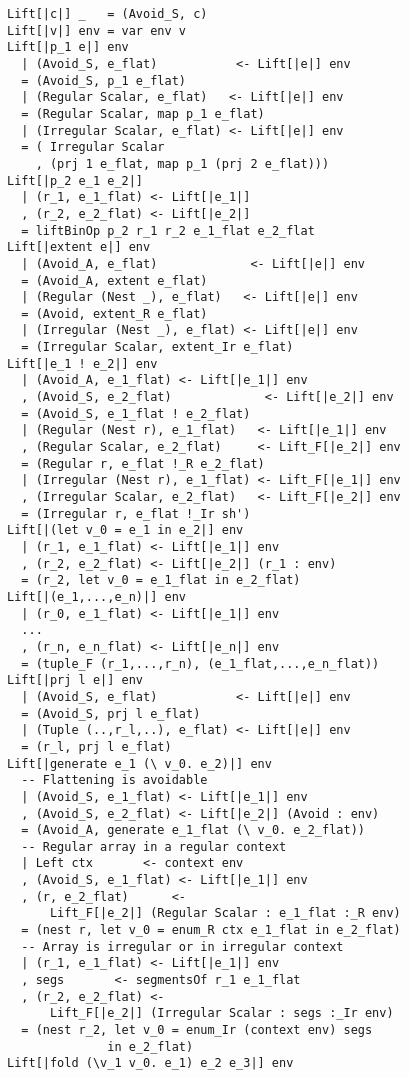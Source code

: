\begin{figure}
\begin{lstlisting}[multicols=2,style=ndp]
Lift[|c|] _   = (Avoid_S, c)
Lift[|v|] env = var env v
Lift[|p_1 e|] env
  | (Avoid_S, e_flat)           <- Lift[|e|] env
  = (Avoid_S, p_1 e_flat)
  | (Regular Scalar, e_flat)   <- Lift[|e|] env
  = (Regular Scalar, map p_1 e_flat)
  | (Irregular Scalar, e_flat) <- Lift[|e|] env
  = ( Irregular Scalar
    , (prj 1 e_flat, map p_1 (prj 2 e_flat)))
Lift[|p_2 e_1 e_2|]
  | (r_1, e_1_flat) <- Lift[|e_1|]
  , (r_2, e_2_flat) <- Lift[|e_2|]
  = liftBinOp p_2 r_1 r_2 e_1_flat e_2_flat
Lift[|extent e|] env
  | (Avoid_A, e_flat)             <- Lift[|e|] env
  = (Avoid_A, extent e_flat)
  | (Regular (Nest _), e_flat)   <- Lift[|e|] env
  = (Avoid, extent_R e_flat)
  | (Irregular (Nest _), e_flat) <- Lift[|e|] env
  = (Irregular Scalar, extent_Ir e_flat)
Lift[|e_1 ! e_2|] env
  | (Avoid_A, e_1_flat) <- Lift[|e_1|] env
  , (Avoid_S, e_2_flat)             <- Lift[|e_2|] env
  = (Avoid_S, e_1_flat ! e_2_flat)
  | (Regular (Nest r), e_1_flat)   <- Lift[|e_1|] env
  , (Regular Scalar, e_2_flat)     <- Lift_F[|e_2|] env
  = (Regular r, e_flat !_R e_2_flat)
  | (Irregular (Nest r), e_1_flat) <- Lift_F[|e_1|] env
  , (Irregular Scalar, e_2_flat)   <- Lift_F[|e_2|] env
  = (Irregular r, e_flat !_Ir sh')
Lift[|(let v_0 = e_1 in e_2|] env
  | (r_1, e_1_flat) <- Lift[|e_1|] env
  , (r_2, e_2_flat) <- Lift[|e_2|] (r_1 : env)
  = (r_2, let v_0 = e_1_flat in e_2_flat)
Lift[|(e_1,...,e_n)|] env
  | (r_0, e_1_flat) <- Lift[|e_1|] env
  ...
  , (r_n, e_n_flat) <- Lift[|e_n|] env
  = (tuple_F (r_1,...,r_n), (e_1_flat,...,e_n_flat))
Lift[|prj l e|] env
  | (Avoid_S, e_flat)           <- Lift[|e|] env
  = (Avoid_S, prj l e_flat)
  | (Tuple (..,r_l,..), e_flat) <- Lift[|e|] env
  = (r_l, prj l e_flat)
Lift[|generate e_1 (\ v_0. e_2)|] env
  -- Flattening is avoidable
  | (Avoid_S, e_1_flat) <- Lift[|e_1|] env
  , (Avoid_S, e_2_flat) <- Lift[|e_2|] (Avoid : env)
  = (Avoid_A, generate e_1_flat (\ v_0. e_2_flat))
  -- Regular array in a regular context
  | Left ctx       <- context env
  , (Avoid_S, e_1_flat) <- Lift[|e_1|] env
  , (r, e_2_flat)      <-
      Lift_F[|e_2|] (Regular Scalar : e_1_flat :_R env)
  = (nest r, let v_0 = enum_R ctx e_1_flat in e_2_flat)
  -- Array is irregular or in irregular context
  | (r_1, e_1_flat) <- Lift[|e_1|] env
  , segs       <- segmentsOf r_1 e_1_flat
  , (r_2, e_2_flat) <-
      Lift_F[|e_2|] (Irregular Scalar : segs :_Ir env)
  = (nest r_2, let v_0 = enum_Ir (context env) segs
              in e_2_flat)
Lift[|fold (\v_1 v_0. e_1) e_2 e_3|] env

\end{lstlisting}
\end{figure}
